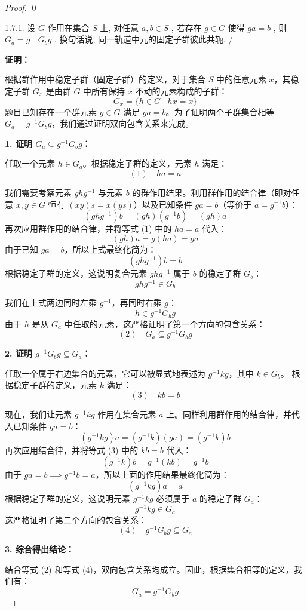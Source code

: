 \documentclass[]{article}
\begin{document}
\begin{proof}
\qed

1.7.1. 设 $G$ 作用在集合 $S$ 上, 对任意 $a, b \in S$ , 若存在 $g \in G$ 使得 $ga = b$ , 则 $G_{a} = g^{-1}G_{b}g$ . 换句话说, 同一轨道中元的固定子群彼此共轭. /

\bigskip
\noindent \textbf{证明：} 

根据群作用中稳定子群（固定子群）的定义，对于集合 $S$ 中的任意元素 $x$，其稳定子群 $G_x$ 是由群 $G$ 中所有保持 $x$ 不动的元素构成的子群：
\[ G_x = \{ h \in G \mid hx = x \} \]
题目已知存在一个群元素 $g \in G$ 满足 $ga = b$。为了证明两个子群集合相等 $G_{a} = g^{-1}G_{b}g$，我们通过证明双向包含关系来完成。

\bigskip
\noindent \textbf{1. 证明 $G_a \subseteq g^{-1}G_b g$：}

任取一个元素 $h \in G_a$。根据稳定子群的定义，元素 $h$ 满足：
\[ (1) \quad ha = a \]

我们需要考察元素 $g h g^{-1}$ 与元素 $b$ 的群作用结果。利用群作用的结合律（即对任意 $x, y \in G$ 恒有 $(xy)s = x(ys)$）以及已知条件 $ga = b$（等价于 $a = g^{-1}b$）：
\[ (g h g^{-1}) b = (gh) (g^{-1}b) = (gh) a \]
再次应用群作用的结合律，并将等式 (1) 中的 $ha = a$ 代入：
\[ (gh) a = g (ha) = g a \]
由于已知 $ga = b$，所以上式最终化简为：
\[ (g h g^{-1}) b = b \]
根据稳定子群的定义，这说明复合元素 $g h g^{-1}$ 属于 $b$ 的稳定子群 $G_b$：
\[ g h g^{-1} \in G_b \]

我们在上式两边同时左乘 $g^{-1}$，再同时右乘 $g$：
\[ h \in g^{-1} G_b g \]
由于 $h$ 是从 $G_a$ 中任取的元素，这严格证明了第一个方向的包含关系：
\[ (2) \quad G_a \subseteq g^{-1} G_b g \]

\bigskip
\noindent \textbf{2. 证明 $g^{-1}G_b g \subseteq G_a$：}

任取一个属于右边集合的元素，它可以被显式地表述为 $g^{-1} k g$，其中 $k \in G_b$。
根据稳定子群的定义，元素 $k$ 满足：
\[ (3) \quad kb = b \]

现在，我们让元素 $g^{-1} k g$ 作用在集合元素 $a$ 上。同样利用群作用的结合律，并代入已知条件 $ga = b$：
\[ (g^{-1} k g) a = (g^{-1} k) (ga) = (g^{-1} k) b \]
再次应用结合律，并将等式 (3) 中的 $kb = b$ 代入：
\[ (g^{-1} k) b = g^{-1} (kb) = g^{-1} b \]
由于 $ga = b \implies g^{-1}b = a$，所以上面的作用结果最终化简为：
\[ (g^{-1} k g) a = a \]
根据稳定子群的定义，这说明元素 $g^{-1} k g$ 必须属于 $a$ 的稳定子群 $G_a$：
\[ g^{-1} k g \in G_a \]
这严格证明了第二个方向的包含关系：
\[ (4) \quad g^{-1} G_b g \subseteq G_a \]

\bigskip
\noindent \textbf{3. 综合得出结论：}

结合等式 (2) 和等式 (4)，双向包含关系均成立。因此，根据集合相等的定义，我们有：
\[ G_a = g^{-1} G_b g \]


\end{proof}
\end{document}
